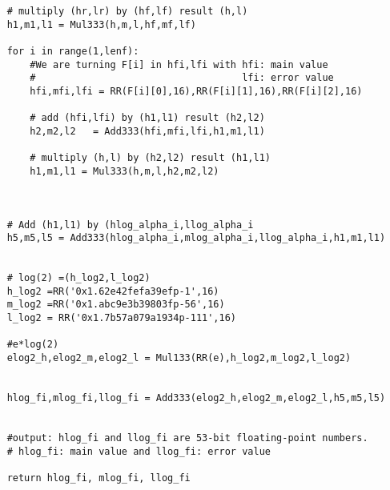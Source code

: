 \begin{lstlisting}
    # multiply (hr,lr) by (hf,lf) result (h,l)
    h1,m1,l1 = Mul333(h,m,l,hf,mf,lf)
    
    for i in range(1,lenf):
        #We are turning F[i] in hfi,lfi with hfi: main value
        #                                    lfi: error value
        hfi,mfi,lfi = RR(F[i][0],16),RR(F[i][1],16),RR(F[i][2],16)

        # add (hfi,lfi) by (h1,l1) result (h2,l2)
        h2,m2,l2   = Add333(hfi,mfi,lfi,h1,m1,l1)

        # multiply (h,l) by (h2,l2) result (h1,l1)
        h1,m1,l1 = Mul333(h,m,l,h2,m2,l2) 
        
    
    
    # Add (h1,l1) by (hlog_alpha_i,llog_alpha_i
    h5,m5,l5 = Add333(hlog_alpha_i,mlog_alpha_i,llog_alpha_i,h1,m1,l1)
    
    
    # log(2) =(h_log2,l_log2)
    h_log2 =RR('0x1.62e42fefa39efp-1',16)
    m_log2 =RR('0x1.abc9e3b39803fp-56',16)
    l_log2 = RR('0x1.7b57a079a1934p-111',16)  
    
    #e*log(2)
    elog2_h,elog2_m,elog2_l = Mul133(RR(e),h_log2,m_log2,l_log2)
   

    hlog_fi,mlog_fi,llog_fi = Add333(elog2_h,elog2_m,elog2_l,h5,m5,l5)
    
    
    #output: hlog_fi and llog_fi are 53-bit floating-point numbers.
    # hlog_fi: main value and llog_fi: error value
    
    return hlog_fi, mlog_fi, llog_fi
\end{lstlisting}

